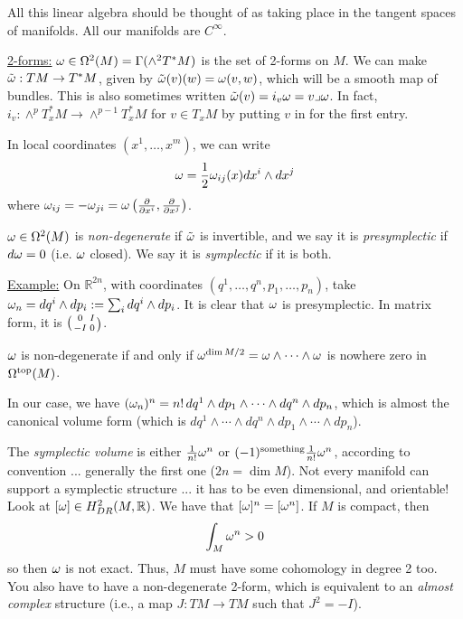  All this linear algebra should be thought of as taking place in
 the tangent spaces of manifolds.  All our manifolds are
 $C^{\infty}$.

 \underline{2-forms:}  $\omega\in \Omega^2(M) = \Gamma(\wedge^2T^*M)$
 is the set of 2-forms on $M$.  We can make $\tilde {\omega}:TM\to
 T^*M$, given by $\tilde {\omega}(v)(w) = \omega(v,w)$, which will be a
 smooth map of bundles.  This is also sometimes written $\tilde
 {\omega}(v) = i_v\omega = v \lrcorner \omega$.  In fact,
 $i_v:\wedge^pT^*_xM\to \wedge^{p-1}T^*_xM$ for $v\in T_xM$
 by putting $v$ in for the first entry.

 In local coordinates $(x^1,\dots, x^m)$, we can write
 \[
    \omega = \frac{1}{2}\omega_{ij}(x)dx^i\wedge dx^j
 \]
 where $\omega_{ij}=-\omega_{ji} = \omega\left(\frac{\partial}{\partial
x^i},\frac{\partial}{\partial x^j}\right)$.

 $\omega\in \Omega^2(M)$ is \emph{non-degenerate} if $\tilde {\omega}$ is
 invertible, and we say it is \emph{presymplectic} if $d\omega=0$
 (i.e. $\omega$ closed).  We say it is \emph{symplectic} if it is
 both.

 \underline{Example:} On $\mathbb{R}^{2n}$, with coordinates
 $(q^1,\dots, q^n,p_1,\dots, p_n)$, take $\omega_n = dq^i\wedge dp_i := \sum_i dq^i\wedge dp_i$.
 It is clear that $\omega$ is presymplectic.  In matrix form, it is
 $\matrix{0}{I}{-I}{0}$.

 \begin{lemma}
   $\omega$ is non-degenerate if and only if $\omega^{\dim M/2} = \omega\wedge\cdots\wedge \omega$ is
   nowhere zero in $\Omega^{\text{top}}(M)$.
 \end{lemma}
 In our case, we have $(\omega_n)^n = n!\, dq^1\wedge dp_1\wedge\cdots\wedge dq^n\wedge
 dp_n$, which is almost the canonical volume form (which is
 $dq^1\wedge\cdots \wedge dq^n\wedge dp_1\wedge\cdots \wedge
 dp_n$).

 The \emph{symplectic volume} is either $\frac{1}{n!}\omega^n$ or
 $(-1)^{\text{something}} \frac{1}{n!}\omega^n$, according to
 convention ... generally the first one ($2n=\dim M$).  Not every
 manifold can support a symplectic structure ... it has to be even
 dimensional, and orientable!  Look at $[\omega]\in
 H^2_{DR}(M,\mathbb{R})$.  We have that $[\omega]^n=[\omega^n]$.  If $M$
 is compact, then
 \[
    \int_M\omega^n > 0
 \]
 so then $\omega$ is not exact.  Thus, $M$ must have some cohomology
 in degree 2 too.  You also have to have a non-degenerate
 2-form, which is equivalent to an \emph{almost complex}
 structure (i.e., a map $J:TM\to TM$ such that $J^2=-I$).


